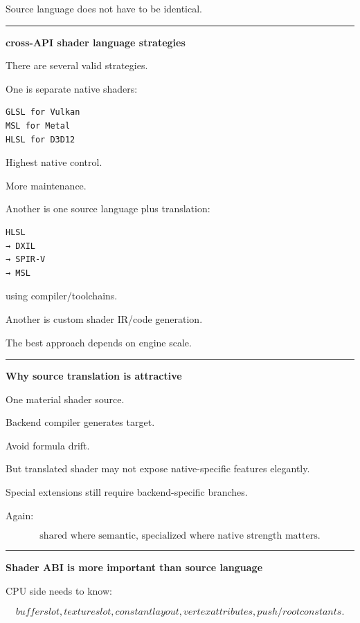 Source language does not have to be identical.

\begin{center}\rule{0.5\linewidth}{0.5pt}\end{center}

\textbf{cross-API shader language strategies}

There are several valid strategies.

One is separate native shaders:

\begin{verbatim}
GLSL for Vulkan
MSL for Metal
HLSL for D3D12
\end{verbatim}

Highest native control.

More maintenance.

Another is one source language plus translation:

\begin{verbatim}
HLSL
→ DXIL
→ SPIR-V
→ MSL
\end{verbatim}

using compiler/toolchains.

Another is custom shader IR/code generation.

The best approach depends on engine scale.

\begin{center}\rule{0.5\linewidth}{0.5pt}\end{center}

\textbf{Why source translation is attractive}

One material shader source.

Backend compiler generates target.

Avoid formula drift.

But translated shader may not expose native-specific features elegantly.

Special extensions still require backend-specific branches.

Again:

\[
\boxed{
\text{shared where semantic, specialized where native strength matters}.
}
\]

\begin{center}\rule{0.5\linewidth}{0.5pt}\end{center}

\textbf{Shader ABI is more important than source language}

CPU side needs to know:

\[
buffer slot,
texture slot,
constant layout,
vertex attributes,
push/root constants.
\]

